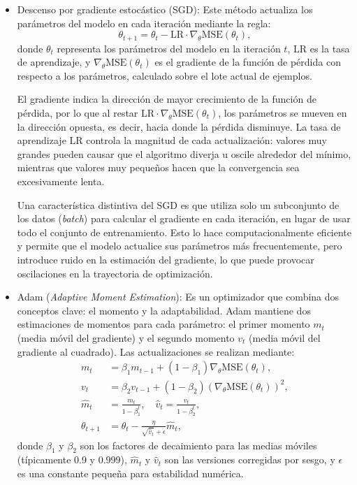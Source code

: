 \begin{itemize}
    \item Descenso por gradiente estocástico (SGD): Este método actualiza los parámetros del modelo en cada iteración mediante la regla:
    \begin{equation}
    	\theta_{t+1} = \theta_t - \text{LR}\cdot\nabla_\theta \text{MSE}(\theta_t),
    \end{equation}
    donde $\theta_t$ representa los parámetros del modelo en la iteración $t$, $\text{LR}$ es la tasa de aprendizaje, y $\nabla_\theta \text{MSE}(\theta_t)$ es el gradiente de la función de pérdida con respecto a los parámetros, calculado sobre el lote actual de ejemplos. 
    
    El gradiente indica la dirección de mayor crecimiento de la función de pérdida, por lo que al restar $\text{LR}\cdot \nabla_\theta \text{MSE}(\theta_t)$, los parámetros se mueven en la dirección opuesta, es decir, hacia donde la pérdida disminuye. La tasa de aprendizaje $\text{LR}$ controla la magnitud de cada actualización: valores muy grandes pueden causar que el algoritmo diverja u oscile alrededor del mínimo, mientras que valores muy pequeños hacen que la convergencia sea excesivamente lenta.
    
    Una característica distintiva del SGD es que utiliza solo un subconjunto de los datos (\emph{batch}) para calcular el gradiente en cada iteración, en lugar de usar todo el conjunto de entrenamiento. Esto lo hace computacionalmente eficiente y permite que el modelo actualice sus parámetros más frecuentemente, pero introduce ruido en la estimación del gradiente, lo que puede provocar oscilaciones en la trayectoria de optimización.
    
    \item Adam (\emph{Adaptive Moment Estimation}): Es un optimizador que combina dos conceptos clave: el momento y la adaptabilidad. Adam mantiene dos estimaciones de momentos para cada parámetro: el primer momento $m_t$ (media móvil del gradiente) y el segundo momento $v_t$ (media móvil del gradiente al cuadrado). Las actualizaciones se realizan mediante:
    \begin{align}
    	m_t &= \beta_1 m_{t-1} + (1 - \beta_1) \nabla_\theta \text{MSE}(\theta_t), \\
    	v_t &= \beta_2 v_{t-1} + (1 - \beta_2) (\nabla_\theta \text{MSE}(\theta_t))^2, \\
    	\hat{m}_t &= \frac{m_t}{1 - \beta_1^t}, \quad \hat{v}_t = \frac{v_t}{1 - \beta_2^t}, \\
    	\theta_{t+1} &= \theta_t - \frac{\eta}{\sqrt{\hat{v}_t} + \epsilon} \hat{m}_t,
    \end{align}
    donde $\beta_1$ y $\beta_2$ son los factores de decaimiento para las medias móviles (típicamente 0.9 y 0.999), $\hat{m}_t$ y $\hat{v}_t$ son las versiones corregidas por sesgo, y $\epsilon$ es una constante pequeña para estabilidad numérica.
    

\end{itemize}
